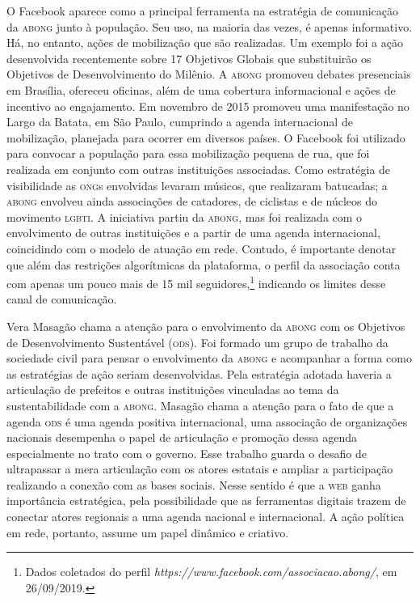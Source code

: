 O Facebook aparece como a principal ferramenta na estratégia de
comunicação da \textsc{abong} junto à população. Seu uso, na maioria das vezes, é
apenas informativo. Há, no entanto, ações de mobilização que são
realizadas. Um exemplo foi a ação desenvolvida recentemente sobre 17
Objetivos Globais que substituirão os Objetivos de Desenvolvimento do
Milênio. A \textsc{abong} promoveu debates presenciais em Brasília, ofereceu
oficinas, além de uma cobertura informacional e ações de incentivo ao
engajamento. Em novembro de 2015 promoveu uma manifestação no Largo da
Batata, em São Paulo, cumprindo a agenda internacional de mobilização,
planejada para ocorrer em diversos países. O Facebook foi utilizado para
convocar a população para essa mobilização pequena de rua, que foi
realizada em conjunto com outras instituições associadas. Como
estratégia de visibilidade as \textsc{ong}s envolvidas levaram músicos, que
realizaram batucadas; a \textsc{abong} envolveu ainda associações de catadores,
de ciclistas e de núcleos do movimento \textsc{lgbti}. A iniciativa partiu da
\textsc{abong}, mas foi realizada com o envolvimento de outras instituições e a
partir de uma agenda internacional, coincidindo com o modelo de atuação
em rede. Contudo, é importante denotar que além das restrições
algorítmicas da plataforma, o perfil da associação conta com apenas um
pouco mais de 15 mil seguidores,\footnote{Dados coletados do perfil
  \emph{https://www.facebook.com/associacao.abong/},
  em 26/09/2019.} indicando os limites desse canal de comunicação.

Vera Masagão chama a atenção para o envolvimento da \textsc{abong} com os
Objetivos de Desenvolvimento Sustentável (\textsc{ods}). Foi formado um grupo de
trabalho da sociedade civil para pensar o envolvimento da \textsc{abong} e
acompanhar a forma como as estratégias de ação seriam desenvolvidas.
Pela estratégia adotada haveria a articulação de prefeitos e outras
instituições vinculadas ao tema da sustentabilidade com a \textsc{abong}. Masagão
chama a atenção para o fato de que a agenda \textsc{ods} é uma agenda positiva
internacional, uma associação de organizações nacionais desempenha o
papel de articulação e promoção dessa agenda especialmente no trato com
o governo. Esse trabalho guarda o desafio de ultrapassar a mera
articulação com os atores estatais e ampliar a participação realizando a
conexão com as bases sociais. Nesse sentido é que a \textsc{web} ganha
importância estratégica, pela possibilidade que as ferramentas digitais
trazem de conectar atores regionais a uma agenda nacional e
internacional. A ação política em rede, portanto, assume um papel
dinâmico e criativo.

